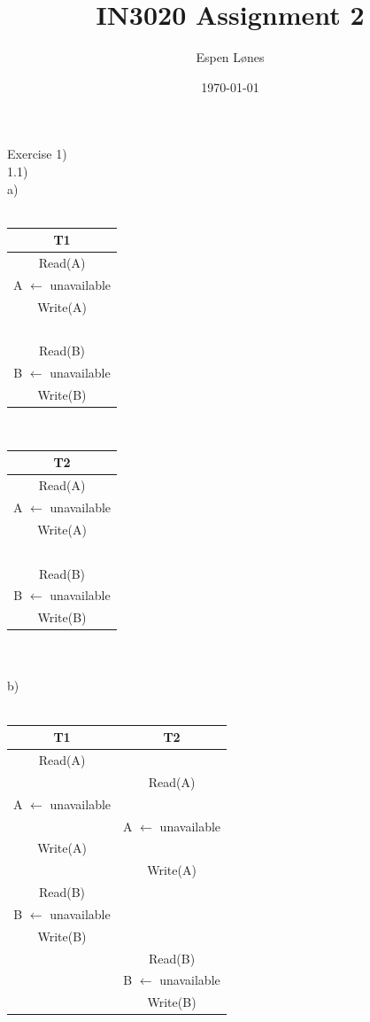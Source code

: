 \documentclass[12pt, letterpaper, twoside]{article}
\begin{document}
\title{IN3020 Assignment 2}
\author{Espen Lønes}
\date{\today}
\maketitle
Exercise 1)\\
1.1)\\
a)\\
\ \\
\begin{tabular}{ |c| }
 \hline
 T1\\ [0.5ex] 
 \hline
 Read(A)\\
 A $\leftarrow$ unavailable\\
 Write(A)\\
 \ \\
 Read(B)\\
 B $\leftarrow$ unavailable\\
 Write(B)\\
 \hline
\end{tabular}
\ \ \ \
\begin{tabular}{ |c| }
 \hline
 T2\\ [0.5ex] 
 \hline
 Read(A)\\
 A $\leftarrow$ unavailable\\
 Write(A)\\
 \ \\
 Read(B)\\
 B $\leftarrow$ unavailable\\
 Write(B)\\
 \hline
\end{tabular}\\
\ \\
b)\\
\ \\
\begin{tabular}{ |c|c| }
 \hline
 T1 & T2\\ [0.5ex]
 \hline 
 Read(A) &\\
 & Read(A)\\
 A $\leftarrow$ unavailable &\\
 & A $\leftarrow$ unavailable\\
 Write(A) &\\
 & Write(A)\\
 Read(B)&\\
 B $\leftarrow$ unavailable&\\
 Write(B)&\\
 &Read(B)\\
 &B $\leftarrow$ unavailable\\
 &Write(B)\\
 \hline
\end{tabular}
\end{document}
